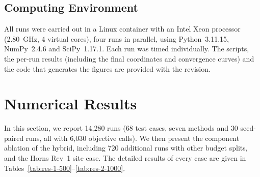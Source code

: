 \documentclass[journal,twoside]{IEEEtran}
\begin{document}
\subsection{Computing Environment}
All runs were carried out in a Linux container with an Intel Xeon processor (2.80~GHz, 4 virtual cores), four runs in parallel, using Python~3.11.15, NumPy~2.4.6 and SciPy~1.17.1. Each run was timed individually. The scripts, the per-run results (including the final coordinates and convergence curves) and the code that generates the figures are provided with the revision.

\section{Numerical Results}
\label{sec:results}
\label{sec:equalbudget}
In this section, we report 14,280 runs (68 test cases, seven methods and 30 seed-paired runs, all with 6,030 objective calls). We then present the component ablation of the hybrid, including 720 additional runs with other budget splits, and the Horns Rev~1 site case. The detailed results of every case are given in Tables~\ref{tab:res-1-500}--\ref{tab:res-2-1000}.
\end{document}
